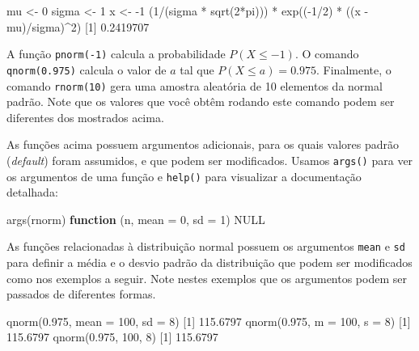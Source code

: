 \documentclass[
  10pt,
  a4paper]{book}
\newenvironment{Shaded}{\begin{snugshade}}{\end{snugshade}}
\newcommand{\AttributeTok}[1]{\textcolor[rgb]{0.77,0.63,0.00}{#1}}
\newcommand{\ConstantTok}[1]{\textcolor[rgb]{0.00,0.00,0.00}{#1}}
\newcommand{\ControlFlowTok}[1]{\textcolor[rgb]{0.13,0.29,0.53}{\textbf{#1}}}
\newcommand{\DecValTok}[1]{\textcolor[rgb]{0.00,0.00,0.81}{#1}}
\newcommand{\FloatTok}[1]{\textcolor[rgb]{0.00,0.00,0.81}{#1}}
\newcommand{\FunctionTok}[1]{\textcolor[rgb]{0.00,0.00,0.00}{#1}}
\newcommand{\NormalTok}[1]{#1}
\newcommand{\OtherTok}[1]{\textcolor[rgb]{0.56,0.35,0.01}{#1}}
\newcommand{\SpecialCharTok}[1]{\textcolor[rgb]{0.00,0.00,0.00}{#1}}
\begin{document}
\begin{Shaded}
\begin{Highlighting}[]
\NormalTok{mu }\OtherTok{\textless{}{-}} \DecValTok{0}
\NormalTok{sigma }\OtherTok{\textless{}{-}} \DecValTok{1}
\NormalTok{x }\OtherTok{\textless{}{-}} \SpecialCharTok{{-}}\DecValTok{1}
\NormalTok{(}\DecValTok{1}\SpecialCharTok{/}\NormalTok{(sigma }\SpecialCharTok{*} \FunctionTok{sqrt}\NormalTok{(}\DecValTok{2}\SpecialCharTok{*}\NormalTok{pi))) }\SpecialCharTok{*} \FunctionTok{exp}\NormalTok{((}\SpecialCharTok{{-}}\DecValTok{1}\SpecialCharTok{/}\DecValTok{2}\NormalTok{) }\SpecialCharTok{*}\NormalTok{ ((x }\SpecialCharTok{{-}}\NormalTok{ mu)}\SpecialCharTok{/}\NormalTok{sigma)}\SpecialCharTok{\^{}}\DecValTok{2}\NormalTok{)}
\NormalTok{[}\DecValTok{1}\NormalTok{] }\FloatTok{0.2419707}
\end{Highlighting}
\end{Shaded}

A função \texttt{pnorm(-1)} calcula a probabilidade \(P(X \leq -1)\). O comando
\texttt{qnorm(0.975)} calcula o valor de \(a\) tal que \(P(X \leq a) = 0.975\).
Finalmente, o comando \texttt{rnorm(10)} gera uma amostra aleatória de 10
elementos da normal padrão. Note que os valores que você obtêm rodando
este comando podem ser diferentes dos mostrados acima.

As funções acima possuem argumentos adicionais, para os quais valores
padrão (\emph{default}) foram assumidos, e que podem ser modificados. Usamos
\texttt{args()} para ver os argumentos de uma função e \texttt{help()} para visualizar
a documentação detalhada:

\begin{Shaded}
\begin{Highlighting}[]
\FunctionTok{args}\NormalTok{(rnorm)}
\ControlFlowTok{function}\NormalTok{ (n, }\AttributeTok{mean =} \DecValTok{0}\NormalTok{, }\AttributeTok{sd =} \DecValTok{1}\NormalTok{) }
\ConstantTok{NULL}
\end{Highlighting}
\end{Shaded}

As funções relacionadas à distribuição normal possuem os argumentos
\texttt{mean} e \texttt{sd} para definir a média e o desvio padrão da distribuição que
podem ser modificados como nos exemplos a seguir. Note nestes exemplos
que os argumentos podem ser passados de diferentes formas.

\begin{Shaded}
\begin{Highlighting}[]
\FunctionTok{qnorm}\NormalTok{(}\FloatTok{0.975}\NormalTok{, }\AttributeTok{mean =} \DecValTok{100}\NormalTok{, }\AttributeTok{sd =} \DecValTok{8}\NormalTok{)}
\NormalTok{[}\DecValTok{1}\NormalTok{] }\FloatTok{115.6797}
\FunctionTok{qnorm}\NormalTok{(}\FloatTok{0.975}\NormalTok{, }\AttributeTok{m =} \DecValTok{100}\NormalTok{, }\AttributeTok{s =} \DecValTok{8}\NormalTok{)}
\NormalTok{[}\DecValTok{1}\NormalTok{] }\FloatTok{115.6797}
\FunctionTok{qnorm}\NormalTok{(}\FloatTok{0.975}\NormalTok{, }\DecValTok{100}\NormalTok{, }\DecValTok{8}\NormalTok{)}
\NormalTok{[}\DecValTok{1}\NormalTok{] }\FloatTok{115.6797}
\end{Highlighting}
\end{Shaded}
\end{document}
